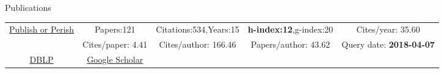 \begin{rubrique}{Publications}

  {\footnotesize

    \centering
    \begin{tabular}{|c||cccc|}
      \hline
      \multirow{2}{4em}{\href{http://www.harzing.com/pop.htm}{Publish or Perish}}
      & Papers:121        & Citations:534,Years:15   & \textbf{h-index:12},g-index:20 & Cites/year: 35.60\\
      & Cites/paper: 4.41 & Cites/author: 166.46 & Papers/author: 43.62 & Query date: \textbf{2018-04-07}\\
      \hline
      \href{http://www.informatik.uni-trier.de/~ley/pers/hd/v/Varrette:S=eacute=bastien.html}{DBLP} &
                                                                                                      \multicolumn{1}{c|}{\href{https://scholar.google.fr/citations?hl=fr\&user=6PTStIcAAAAJ\&view_op=list_works\&sortby=pubdate}{Google Scholar}}\\
      \cline{1-2}
    \end{tabular}
  }
  ~\\[2em]




\end{rubrique}





%
